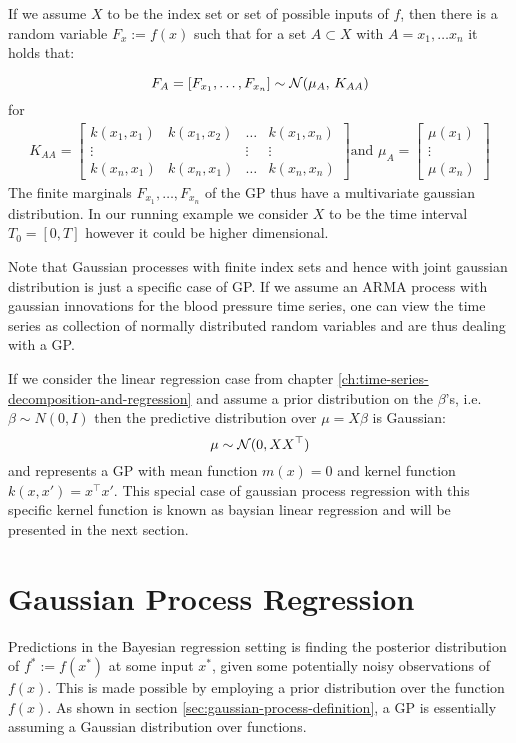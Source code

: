 If we assume $X$ to be the index set or set of possible inputs of $f$, then there is a random variable
$F_x := f(x)$ such that for a set $A \subset X$ with $A={x_1, \dots x_n}$ it holds that:

\[F_A = [F_{x_1}, \dots , F_{x_n}] \sim \operatorname{\mathcal{N}}(\mu_A,\,K_{AA})\]
for
\begin{gather}
    K_{AA} =
    \begin{bmatrix}
        k(x_1, x_1) & k(x_1, x_2) & \dots & k(x_1, x_n)\\
        \vdots  &  & \vdots  & \vdots \\
        k(x_n, x_1)  & k(x_n, x_1) & \dots  & k(x_n, x_n)
    \end{bmatrix} \text{and }
    \mu_A =
    \begin{bmatrix}
        \mu(x_1) \\
        \vdots \\
        \mu(x_n)
    \end{bmatrix}
\end{gather}
The finite marginals $F_{x_1}, \dots, F_{x_n}$ of the GP thus have a multivariate gaussian distribution.
In our running example we consider $X$ to be the time interval $T_0=[0, T]$ however it could be higher dimensional.

Note that Gaussian processes with finite index sets and hence with joint gaussian distribution is just a specific case
of GP. If we assume an ARMA process with gaussian innovations for the blood pressure time series, one can view the time series
as collection of normally distributed random variables and are thus dealing with a GP.


If we consider the linear regression case from chapter \ref{ch:time-series-decomposition-and-regression} and assume a
prior distribution
on the $\beta$'s, i.e. $\beta \sim N(0, I)$ then the predictive distribution over $\mu = X \beta$ is Gaussian:
\[
    \mu \sim \operatorname{\mathcal{N}}(0, XX^{\top})
\]
and represents a GP with mean function $m(x) = 0$ and kernel function $k(x, x') = x^{\top}x'$.
This special case of gaussian process regression with this specific kernel function is known as baysian linear regression
and will be presented in the next section.


\section{Gaussian Process Regression}
Predictions in the Bayesian regression setting is finding the posterior distribution of
$f^{\ast} := f(x^{\ast})$ at some input $x^{\ast}$, given some potentially noisy observations of $f(x)$.
This is made possible by employing a prior distribution
over the function $f(x)$. As shown in section \ref{sec:gaussian-process-definition}, a GP is essentially
assuming a Gaussian distribution over functions.


